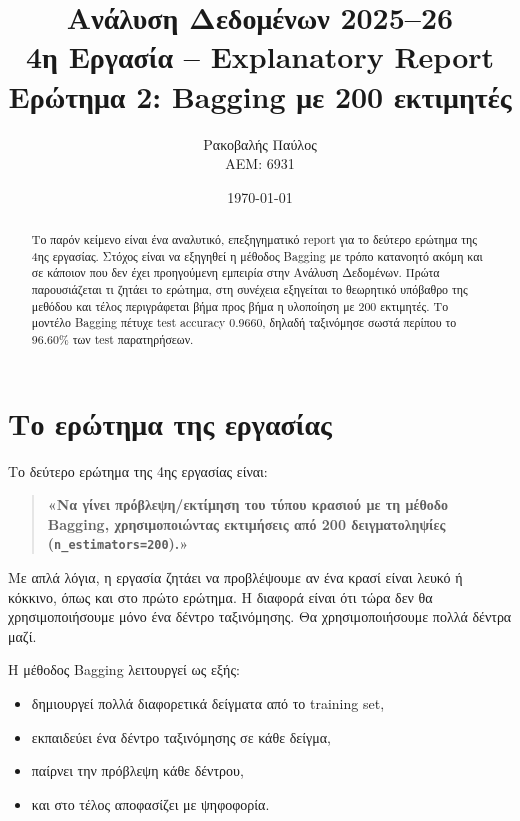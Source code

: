 \documentclass[12pt,a4paper]{article}
\title{
    \textbf{Ανάλυση Δεδομένων 2025--26}\\[0.25cm]
    \Large 4η Εργασία -- Explanatory Report\\[0.15cm]
    \large Ερώτημα 2: Bagging με 200 εκτιμητές
}
\author{
    Ρακοβαλής Παύλος\\
    ΑΕΜ: 6931
}
\date{\today}
\newcommand{\code}[1]{\texttt{\textenglish{#1}}}
\begin{document}
\maketitle
\thispagestyle{fancy}

\begin{abstract}
Το παρόν κείμενο είναι ένα αναλυτικό, επεξηγηματικό report για το δεύτερο
ερώτημα της 4ης εργασίας. Στόχος είναι να εξηγηθεί η μέθοδος Bagging με τρόπο
κατανοητό ακόμη και σε κάποιον που δεν έχει προηγούμενη εμπειρία στην Ανάλυση
Δεδομένων. Πρώτα παρουσιάζεται τι ζητάει το ερώτημα, στη συνέχεια εξηγείται
το θεωρητικό υπόβαθρο της μεθόδου και τέλος περιγράφεται βήμα προς βήμα η
υλοποίηση με 200 εκτιμητές. Το μοντέλο Bagging πέτυχε test accuracy 0.9660,
δηλαδή ταξινόμησε σωστά περίπου το 96.60\% των test παρατηρήσεων.
\end{abstract}

\tableofcontents
\newpage

\section{Το ερώτημα της εργασίας}

Το δεύτερο ερώτημα της 4ης εργασίας είναι:

\begin{quote}
\textbf{«Να γίνει πρόβλεψη/εκτίμηση του τύπου κρασιού με τη μέθοδο Bagging,
χρησιμοποιώντας εκτιμήσεις από 200 δειγματοληψίες
(\code{n\_estimators=200}).»}
\end{quote}

Με απλά λόγια, η εργασία ζητάει να προβλέψουμε αν ένα κρασί είναι λευκό ή
κόκκινο, όπως και στο πρώτο ερώτημα. Η διαφορά είναι ότι τώρα δεν θα
χρησιμοποιήσουμε μόνο ένα δέντρο ταξινόμησης. Θα χρησιμοποιήσουμε πολλά
δέντρα μαζί.

Η μέθοδος Bagging λειτουργεί ως εξής:

\begin{itemize}
    \item δημιουργεί πολλά διαφορετικά δείγματα από το training set,
    \item εκπαιδεύει ένα δέντρο ταξινόμησης σε κάθε δείγμα,
    \item παίρνει την πρόβλεψη κάθε δέντρου,
    \item και στο τέλος αποφασίζει με ψηφοφορία.
\end{itemize}
\end{document}
